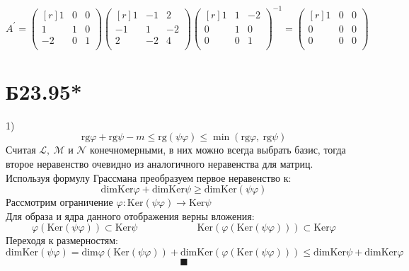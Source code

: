 \documentclass[a4paper,12pt]{article} %
\begin{document}
$$A^{\prime}=\begin{pmatrix*}[r]
    1&0&0\\
    1&1&0\\
    -2&0&1\\
\end{pmatrix*}\begin{pmatrix*}[r]
    1&-1&2\\
    -1&1&-2\\
    2&-2&4\\
\end{pmatrix*}\begin{pmatrix*}[r]
    1&1&-2\\
    0&1&0\\
    0&0&1\\
\end{pmatrix*}^{-1}=\begin{pmatrix*}[r]
    1&0&0\\
    0&0&0\\
    0&0&0\\
\end{pmatrix*}$$
\section*{Б23.95*}1)$$\mathrm{rg}\varphi+\mathrm{rg}\psi-m\le\mathrm{rg}(\psi\varphi)\le\min(\mathrm{rg}\varphi,\ \mathrm{rg}\psi)$$
Считая $\mathcal{L},\ \mathcal{M}$ и $\mathcal{N}$ конечномерными, в них можно всегда выбрать базис, тогда второе неравенство очевидно из аналогичного неравенства для матриц.\\
Используя формулу Грассмана преобразуем первое неравенство к:
$$\mathrm{dim}\mathrm{Ker}\varphi+\mathrm{dim}\mathrm{Ker}\psi\ge\mathrm{dim}\mathrm{Ker}(\psi\varphi)$$
Рассмотрим ограничение $\varphi:\mathrm{Ker}(\psi\varphi)\to\mathrm{Ker}\psi$\\
Для образа и ядра данного отображения верны вложения:
$$\varphi\left(\mathrm{Ker}(\psi\varphi)\right)\subset\mathrm{Ker}\psi\qquad\qquad\qquad\mathrm{Ker}\left(\varphi\left(\mathrm{Ker}(\psi\varphi)\right)\right)\subset\mathrm{Ker}\varphi$$
Переходя к размерностям:
$$\mathrm{dim}\mathrm{Ker}(\psi\varphi)=\mathrm{dim}\varphi\left(\mathrm{Ker}(\psi\varphi)\right)+\mathrm{dim}\mathrm{Ker}\left(\varphi\left(\mathrm{Ker}(\psi\varphi)\right)\right)\le\mathrm{dim}\mathrm{Ker}\psi+\mathrm{dim}\mathrm{Ker}\varphi$$
$$\blacksquare$$
\end{document}
